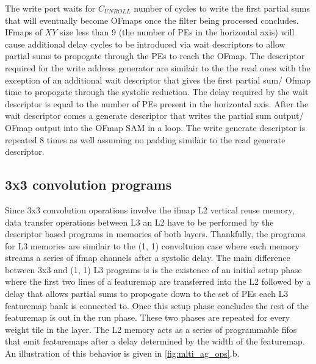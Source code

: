 The write port waits for $C_{UNROLL}$ number of cycles to write the first
partial sums that will eventually become OFmaps once the filter being processed
concludes. IFmaps of $XY$ size less than 9 (the number of PEs in the horizontal
axis) will cause additional delay cycles to be introduced via wait descriptors
to allow partial sums to propogate through the PEs to reach the OFmap.
 The descriptor required for
the write address generator are similair to the the read ones with the exception
of an additional wait descriptor that gives the first partial sum/ Ofmap time to
propogate through the systolic reduction. The delay required by the wait
descriptor is equal to the number of PEs present in the horizontal axis. After
the wait descriptor comes a generate descriptor that writes the partial sum
output/ OFmap output into the OFmap SAM in a loop. The write generate
descriptor is repeated 8 times as well assuming no padding similair to
the read generate descriptor.

\subsection{3x3 convolution programs}
\label{chap:sams:acc_scheduling:3x3}

Since 3x3 convolution operations involve the ifmap L2 vertical reuse memory,
data transfer operations between L3 an L2 have to be performed by the descriptor
based programs in memories of both layers. Thankfully, the programs for L3
memories are similair to the (1, 1) convoltuion case where each memory streams a
series of ifmap channels after a systolic delay. The main difference between 3x3
and (1, 1) L3 programs is is the existence of an initial setup phase where the
first two lines of a featuremap are transferred into the L2 followed by a delay
that allows partial sums to propogate down to the set of PEs each L3 featuremap
bank is connected to. Once this setup phase concludes the rest of the
featuremap is out in the run phase. These two phases are repeated for every
weight tile in the layer. The L2 memory acts as a series of programmable fifos
that emit featuremaps after a delay determined by the width of the featuremap.
An illustration of this behavior is given in \autoref{fig:mlti_ag_ops}.b. 


